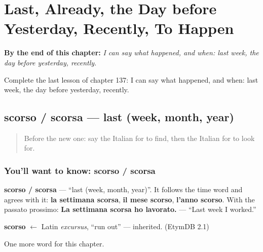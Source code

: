 
\chapter{Last, Already, the Day before Yesterday, Recently, To Happen}
\label{ch:it-last-already-the-day-before-yesterday-recently-to-happen}

\begin{chapteropening}
\textbf{By the end of this chapter:} \emph{I can say what happened, and when: last week, the day before yesterday, recently.}

Complete the last lesson of chapter 137: I can say what happened, and when: last week, the day before yesterday, recently.
\end{chapteropening}

\section[scorso / scorsa]{scorso / scorsa — last (week, month, year)}

\label{lesson:IT-C137-scorso}



\begin{quote}
Before the new one: say the Italian for to find, then the Italian for to look for.
\end{quote}

\subsection*{You'll want to know: scorso / scorsa}
\textbf{scorso / scorsa} — \textquotedblleft{}last (week, month, year)\textquotedblright{}. It follows the time word and agrees with it: \textbf{la settimana scorsa}, \textbf{il mese scorso}, \textbf{l'anno scorso}. With the passato prossimo: \textbf{La settimana scorsa ho lavorato.} — \textquotedblleft{}Last week I worked.\textquotedblright{}

\begin{cousinweb}
\textbf{scorso} $\leftarrow$ Latin \emph{excursus}, \textquotedblleft{}run out\textquotedblright{} — inherited. (EtymDB 2.1)
\end{cousinweb}

\begin{grammarlens}[title={What you've built}]
One more word for this chapter.
\end{grammarlens}


